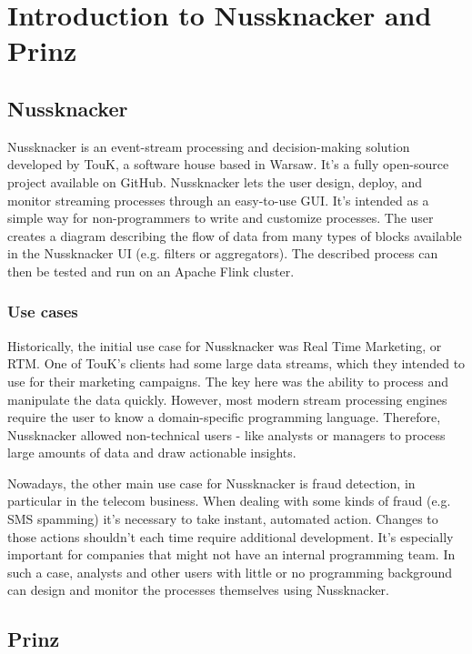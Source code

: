 \chapter{Introduction to Nussknacker and Prinz}
\label{chap:intro-nussknacker-prinz}

\section{Nussknacker}

Nussknacker is an event-stream processing and decision-making solution developed by TouK, a software house based in Warsaw.
It's a fully open-source project available on GitHub.
Nussknacker lets the user design, deploy, and monitor streaming processes through an easy-to-use GUI.
It's intended as a simple way for non-programmers to write and customize processes.
The user creates a diagram describing the flow of data from many types of blocks available in the Nussknacker UI (e.g. filters or aggregators).
The described process can then be tested and run on an Apache Flink cluster.

\subsection{Use cases}

Historically, the initial use case for Nussknacker was Real Time Marketing, or RTM.
One of TouK's clients had some large data streams, which they intended to use for their marketing campaigns.
The key here was the ability to process and manipulate the data quickly.
However, most modern stream processing engines require the user to know a domain-specific programming language.
Therefore, Nussknacker allowed non-technical users - like analysts or managers to process large amounts of data and draw actionable insights.

Nowadays, the other main use case for Nussknacker is fraud detection, in particular in the telecom business.
When dealing with some kinds of fraud (e.g. SMS spamming) it's necessary to take instant, automated action.
Changes to those actions shouldn't each time require additional development.
It's especially important for companies that might not have an internal programming team.
In such a case, analysts and other users with little or no programming background can design and monitor the processes themselves using Nussknacker.

\section{Prinz}

